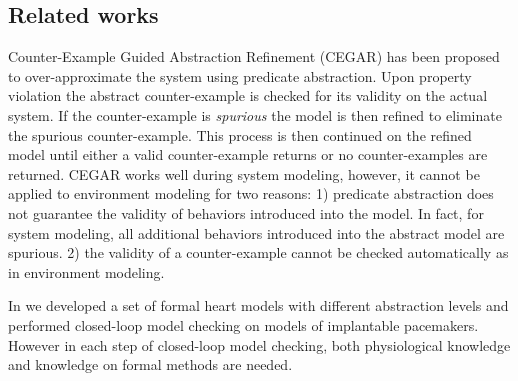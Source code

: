 \subsection{Related works}
Counter-Example Guided Abstraction Refinement (CEGAR) \cite{CEGAR} has been proposed to over-approximate the system using predicate abstraction. Upon property violation the abstract counter-example is checked for its validity on the actual system. If the counter-example is \emph{spurious} the model is then refined to eliminate the spurious counter-example. This process is then continued on the refined model until either a valid counter-example returns or no counter-examples are returned. CEGAR works well during system modeling, however, it cannot be applied to environment modeling for two reasons: 1) predicate abstraction does not guarantee the validity of behaviors introduced into the model. In fact, for system modeling, all additional behaviors introduced into the abstract model are spurious. 2) the validity of a counter-example cannot be checked automatically as in environment modeling. 

In \cite{sttt13} we developed a set of formal heart models with different abstraction levels and performed closed-loop model checking on models of implantable pacemakers. 
However in each step of closed-loop model checking, both physiological knowledge and knowledge on formal methods are needed.

